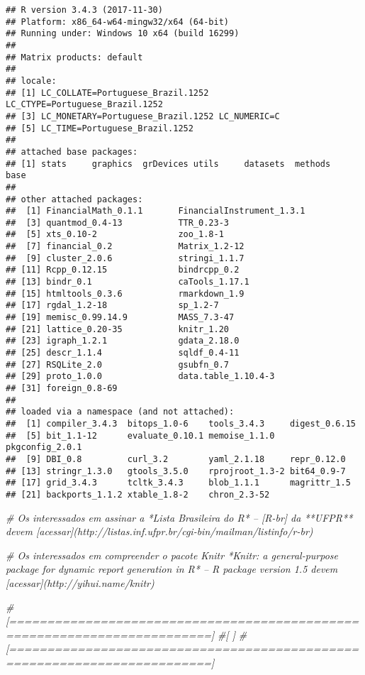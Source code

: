 \documentclass[]{article}
\newenvironment{Shaded}{\begin{snugshade}}{\end{snugshade}}
\newcommand{\CommentTok}[1]{\textcolor[rgb]{0.56,0.35,0.01}{\textit{#1}}}
\begin{document}
\begin{verbatim}
## R version 3.4.3 (2017-11-30)
## Platform: x86_64-w64-mingw32/x64 (64-bit)
## Running under: Windows 10 x64 (build 16299)
## 
## Matrix products: default
## 
## locale:
## [1] LC_COLLATE=Portuguese_Brazil.1252  LC_CTYPE=Portuguese_Brazil.1252   
## [3] LC_MONETARY=Portuguese_Brazil.1252 LC_NUMERIC=C                      
## [5] LC_TIME=Portuguese_Brazil.1252    
## 
## attached base packages:
## [1] stats     graphics  grDevices utils     datasets  methods   base     
## 
## other attached packages:
##  [1] FinancialMath_0.1.1       FinancialInstrument_1.3.1
##  [3] quantmod_0.4-13           TTR_0.23-3               
##  [5] xts_0.10-2                zoo_1.8-1                
##  [7] financial_0.2             Matrix_1.2-12            
##  [9] cluster_2.0.6             stringi_1.1.7            
## [11] Rcpp_0.12.15              bindrcpp_0.2             
## [13] bindr_0.1                 caTools_1.17.1           
## [15] htmltools_0.3.6           rmarkdown_1.9            
## [17] rgdal_1.2-18              sp_1.2-7                 
## [19] memisc_0.99.14.9          MASS_7.3-47              
## [21] lattice_0.20-35           knitr_1.20               
## [23] igraph_1.2.1              gdata_2.18.0             
## [25] descr_1.1.4               sqldf_0.4-11             
## [27] RSQLite_2.0               gsubfn_0.7               
## [29] proto_1.0.0               data.table_1.10.4-3      
## [31] foreign_0.8-69           
## 
## loaded via a namespace (and not attached):
##  [1] compiler_3.4.3  bitops_1.0-6    tools_3.4.3     digest_0.6.15  
##  [5] bit_1.1-12      evaluate_0.10.1 memoise_1.1.0   pkgconfig_2.0.1
##  [9] DBI_0.8         curl_3.2        yaml_2.1.18     repr_0.12.0    
## [13] stringr_1.3.0   gtools_3.5.0    rprojroot_1.3-2 bit64_0.9-7    
## [17] grid_3.4.3      tcltk_3.4.3     blob_1.1.1      magrittr_1.5   
## [21] backports_1.1.2 xtable_1.8-2    chron_2.3-52
\end{verbatim}

\begin{Shaded}
\begin{Highlighting}[]
\CommentTok{# Os interessados em assinar a *Lista Brasileira do R* -- [R-br] da **UFPR** devem [acessar](http://listas.inf.ufpr.br/cgi-bin/mailman/listinfo/r-br)}

\CommentTok{# Os interessados em compreender o pacote Knitr *Knitr: a general-purpose package for dynamic report generation in R* -- R package version 1.5 devem [acessar](http://yihui.name/knitr)}

\CommentTok{#[=========================================================================]}
\CommentTok{#[                                                                         ]}
\CommentTok{#[=========================================================================]}
\end{Highlighting}
\end{Shaded}
\end{document}
